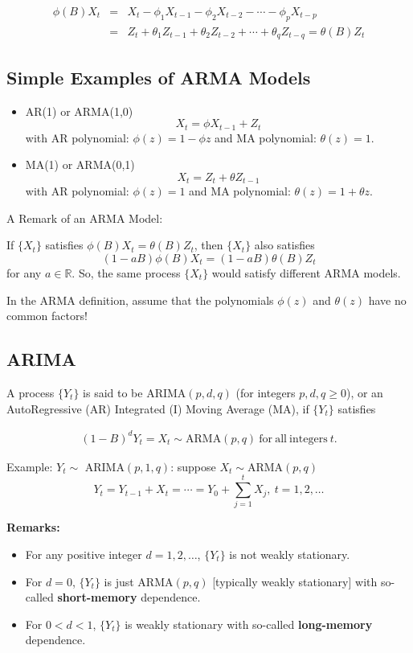 \documentclass[]{book}
\providecommand{\tightlist}{%
  \setlength{\itemsep}{0pt}\setlength{\parskip}{0pt}}
\begin{document}
\begin{eqnarray*}
\phi(B)X_t &=& X_t -\phi_1 X_{t-1} -\phi_2 X_{t-2} - \cdots -\phi_p X_{t-p}\\
&=&Z_t+\theta_1 Z_{t-1} +\theta_2 Z_{t-2} + \cdots +\theta_q Z_{t-q}=\theta(B)Z_t
\end{eqnarray*}

\subsection{Simple Examples of ARMA
Models}\label{simple-examples-of-arma-models}

\begin{itemize}
\item
  AR(1) or ARMA(1,0) \[
  X_t=\phi X_{t-1}+Z_{t}
  \] with AR polynomial: \(\phi(z)=1-\phi z\) and MA polynomial:
  \(\theta(z)=1\).
\item
  MA(1) or ARMA(0,1) \[
  X_t=Z_{t}+\theta Z_{t-1}
  \] with AR polynomial: \(\phi(z)=1\) and MA polynomial:
  \(\theta(z)=1 +\theta z\).
\end{itemize}

A Remark of an ARMA Model:

If \(\{X_t\}\) satisfies \(\phi(B)X_t = \theta(B)Z_t\), then \(\{X_t\}\)
also satisfies \[
(1 - aB)\phi(B)X_t = (1-aB)\theta(B)Z_t
\] for any \(a\in \mathbb{R}\). So, the same process \(\{X_t\}\) would
satisfy different ARMA models.

In the ARMA definition, assume that the polynomials \(\phi(z)\) and
\(\theta(z)\) have no common factors!

\subsection{ARIMA}\label{arima}

A process \(\{Y_t\}\) is said to be ARIMA\((p,d,q)\) (for integers
\(p,d,q \geq 0\)), or an AutoRegressive (AR) Integrated (I) Moving
Average (MA), if \(\{Y_t\}\) satisfies

\begin{eqnarray*}
(1-B)^d Y_t = X_t \sim \mathrm{ARMA}(p,q) \mathrm{~for~all~integers~} t.
\end{eqnarray*}

Example: \(Y_t \sim\) ARIMA\((p,1,q)\): suppose
\(X_t \sim \mathrm{ARMA}(p,q)\) \[
Y_t=Y_{t-1}+X_t=\cdots=Y_{0}+\sum_{j=1}^t X_j, ~ t=1,2, \ldots
\]

\textbf{Remarks:}

\begin{itemize}
\tightlist
\item
  For any positive integer \(d=1,2,\ldots\), \(\{Y_t\}\) is not weakly
  stationary.
\item
  For \(d = 0\), \(\{Y_t\}\) is just \(\mathrm{ARMA}(p, q)\)
  {[}typically weakly stationary{]} with so-called \textbf{short-memory}
  dependence.
\item
  For \(0<d<1\), \(\{Y_t\}\) is weakly stationary with so-called
  \textbf{long-memory} dependence.
\end{itemize}
\end{document}
